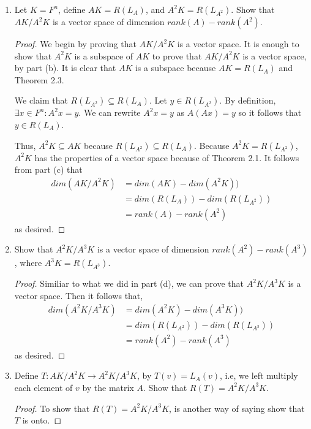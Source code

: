 \documentclass[11pt]{scrartcl}
\begin{document}
\begin{enumerate}[label=\alph*.]
	\item{
	      Let $K = F^n$, define $AK = R(L_A)$, and $A^2K = R(L_{A^2})$.
	      Show that $AK/A^2K$ is a vector space of dimension $rank(A) - rank(A^2)$.
	      \begin{proof}
		      We begin by proving that $AK/A^2K$ is a vector space. It is enough to show that $A^2K$ is a subspace of $AK$
		      to prove that $AK/A^2K$ is a vector space, by part (b). It is clear that $AK$ is a subspace because $AK = R(L_A)$
		      and Theorem 2.3.\par
		      We claim that $R(L_{A^2}) \subseteq R(L_A)$.  Let $y \in R(L_{A^2})$.
		      By definition, $\exists x \in F^n : A^2x = y$. We can rewrite $A^2x = y$ as
		      $A(Ax) = y$ so it follows that $y \in R(L_A)$.\par
		      Thus, $A^2K \subseteq AK$ because $R(L_{A^2}) \subseteq R(L_A)$.
		      Because $A^2K = R(L_{A^2})$, $A^2K$ has the properties of a vector space because of Theorem 2.1.
		      It follows from part (c) that
		      \begin{align*}
			      dim(AK/A^2K) & = dim(AK) - dim(A^2K))          \\
			                   & = dim(R(L_A)) - dim(R(L_{A^2})) \\
			                   & = rank(A) - rank(A^2)
		      \end{align*}
		      as desired.
	      \end{proof}
	      }
	\item{
	      Show that $A^2K/A^3K$ is a vector space of dimension $rank(A^2) - rank(A^3)$, where $A^3K= R(L_{A^3})$.
	      \begin{proof}
		      Similiar to what we did in part (d), we can prove that $A^2K/A^3K$ is a vector space.
		      Then it follows that,
		      \begin{align*}
			      dim(A^2K/A^3K) & = dim(A^2K) - dim(A^3K))            \\
			                     & = dim(R(L_{A^2})) - dim(R(L_{A^3})) \\
			                     & = rank(A^2) - rank(A^3)
		      \end{align*}
		      as desired.
	      \end{proof}
	      }
	\item{
	      Define $T: AK/A^2K \rightarrow A^2K/A^3K$, by $T(v) = L_A(v)$, i.e, we left multiply each element of $v$ by the matrix $A$.
	      Show that $R(T) = A^2K/A^3K$.
	      \begin{proof}
		      To show that $R(T) = A^2K/A^3K$, is another way of saying show that $T$ is onto.

\end{proof}}
\end{enumerate}
\end{document}
